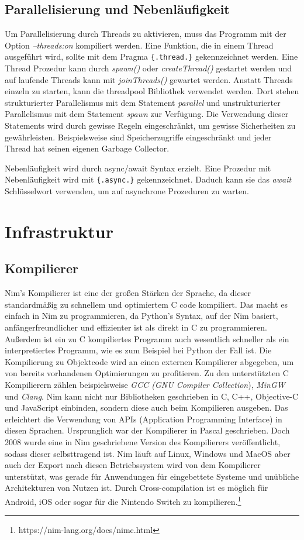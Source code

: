 \documentclass[11pt]{report}
\begin{document}
\subsection{Parallelisierung und Nebenläufigkeit}
Um Parallelisierung durch Threads zu aktivieren, muss das Programm mit der Option \emph{--threads:on} kompiliert werden. Eine Funktion, die in einem Thread ausgeführt wird, sollte mit dem Pragma \verb|{.thread.}| gekennzeichnet werden. Eine Thread Prozedur kann durch \emph{spawn()} oder \emph{createThread()} gestartet werden und auf laufende Threads kann mit \emph{joinThreads()} gewartet werden.
Anstatt Threads einzeln zu starten, kann die threadpool Bibliothek verwendet werden. Dort stehen strukturierter Parallelismus mit dem Statement \emph{parallel} und unstrukturierter Parallelismus mit dem Statement \emph{spawn} zur Verfügung. Die Verwendung dieser Statements wird durch gewisse Regeln eingeschränkt, um gewisse Sicherheiten zu gewährleisten. Beispielsweise sind Speicherzugriffe eingeschränkt und jeder Thread hat seinen eigenen Garbage Collector.

Nebenläufigkeit wird durch async/await Syntax erzielt. Eine Prozedur mit Nebenläufigkeit wird mit \verb|{.async.}| gekennzeichnet. Daduch kann sie das \emph{await} Schlüsselwort verwenden, um auf asynchrone Prozeduren zu warten.


\section{Infrastruktur}
\subsection{Kompilierer}
Nim's Kompilierer ist eine der großen Stärken der Sprache, da dieser standardmäßig zu schnellem und optimiertem C code kompiliert. Das macht es einfach in Nim zu programmieren, da Python's Syntax, auf der Nim basiert, anfängerfreundlicher und effizienter ist als direkt in C zu programmieren.
Außerdem ist ein zu C kompiliertes Programm auch wesentlich schneller als ein interpretiertes Programm, wie es zum Beispiel bei Python der Fall ist.
Die Kompilierung zu Objektcode wird an einen externen Kompilierer abgegeben, um von bereits vorhandenen Optimierungen zu profitieren. Zu den unterstützten C Kompilierern zählen beispielsweise \emph{GCC (GNU Compiler Collection}), \emph{MinGW} und \emph{Clang}. Nim kann nicht nur Bibliotheken geschrieben in C, C++, Objective-C und JavaScript einbinden, sondern diese auch beim Kompilieren ausgeben. Das erleichtert die Verwendung von APIs (Application Programming Interface) in diesen Sprachen.
Ursprunglich war der Kompilierer in Pascal geschrieben. Doch 2008 wurde eine in Nim geschriebene Version des Kompilierers veröffentlicht, sodass dieser selbsttragend ist. Nim läuft auf Linux, Windows und MacOS aber auch der Export nach diesen Betriebssystem wird von dem Kompilierer unterstützt, was gerade für Anwendungen für eingebettete Systeme und unübliche Architekturen von Nutzen ist.
Durch Cross-compilation ist es möglich für Android, iOS oder sogar für die Nintendo Switch zu kompilieren.\footnote{https://nim-lang.org/docs/nimc.html}
\end{document}
